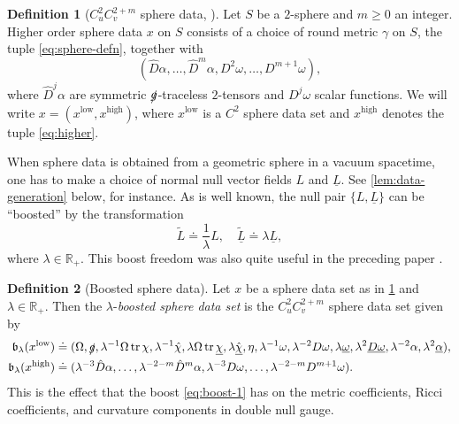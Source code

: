 \documentclass[10pt]{article}
\numberwithin{equation}{section}
\theoremstyle{plain}
\theoremstyle{definition}
\newtheorem{defn}{Definition}[section]
\renewcommand{\Bbb}{\mathbb}
\newcommand{\tr}{\operatorname{tr}}
\begin{document}
\begin{defn}[$C^2_u C^{2+m}_{v}$ sphere data, 
 {\cite[Definition 2.28]{ACR2}}]\label{def:higher-order-data}
Let $S$ be a $2$-sphere and $m\ge 0$ an integer. Higher order sphere data $x$ on $S$ consists of a choice of round metric $\gamma$ on $S$, the tuple \eqref{eq:sphere-defn}, together with
\begin{equation}
    (\hat D\alpha,\dotsc, \hat D^m\alpha,D^2\omega,\dotsc,D^{m+1}\omega),\label{eq:higher}
\end{equation}
where $\hat D^j\alpha$ are symmetric $\slashed g$-traceless $2$-tensors and $D^j\omega$ scalar functions. We will write $x=(x^\mathrm{low},x^\mathrm{high})$, where $x^\mathrm{low}$ is a $C^2$ sphere data set and $x^\mathrm{high}$ denotes the tuple \eqref{eq:higher}. 
\end{defn}

When sphere data is obtained from a geometric sphere in a vacuum spacetime, one has to make a choice of normal null vector fields $L$ and $\underline L$. See \cref{lem:data-generation} below, for instance. As is well known, the null pair $\{L,\underline L\}$ can be ``boosted''  by the transformation 
\begin{equation}
\tilde L \doteq \frac{1}{\lambda} L,\quad \tilde{\underline L}\doteq \lambda \underline L,\label{eq:boost-1}
\end{equation} where $\lambda\in\Bbb R_+$. This boost freedom was also quite useful in the preceding paper \cite{KU22}.

\begin{defn}[Boosted sphere data]\label{def:boost}
Let $x$ be a sphere data set as in \cref{def:higher-order-data} and $\lambda\in\Bbb R_+$. Then the $\lambda$-\emph{boosted sphere data set} is the $C^2_uC^{2+m}_v$ sphere data set given by 
\begin{align*}
    \mathfrak b_\lambda(x^\mathrm{low})&\doteq (\Omega, \slashed g, \lambda^{-1}\Omega \tr\chi , \lambda^{-1}\hat \chi, \lambda\Omega \tr \underline\chi,\lambda \hat{\underline \chi}, \eta, \lambda^{-1}\omega, \lambda^{-2}D \omega,\lambda\underline \omega,\lambda^2 \underline{D \omega} , \lambda^{-2}\alpha, \lambda^2\underline \alpha), \\
     \mathfrak b_\lambda(x^\mathrm{high})&\doteq (\lambda^{-3}\hat D\alpha,\dotsc,\lambda^{-2-m}\hat D^m\alpha,\lambda^{-3}D\omega,\dotsc,\lambda^{-2-m}D^{m+1}\omega).
\end{align*}
This is the effect that the boost \eqref{eq:boost-1} has on the metric coefficients, Ricci coefficients, and curvature components in double null gauge. 
\end{defn}
\end{document}

